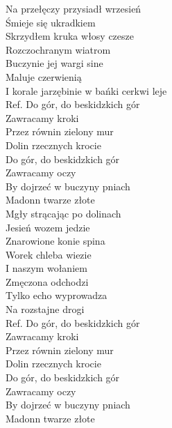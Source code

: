 
\begin{flushleft}
Na przełęczy przysiadł wrzesień  \\
Śmieje się ukradkiem\tab{} \\
Skrzydłem kruka włosy czesze\tab{}  \\
Rozczochranym wiatrom \tab{} \\
Buczynie jej wargi sine\tab{} \\
Maluje czerwienią \tab{} \\
I korale jarzębinie w bańki cerkwi leje \\
\vskip 3mm
Ref. Do gór, do beskidzkich gór \\
\hspace{0.9cm}Zawracamy kroki \tab{}\\
\hspace{0.9cm}Przez równin zielony mur \tab{} \\
\hspace{0.9cm}Dolin rzecznych krocie\tab{}  \\
\hspace{0.9cm}Do gór, do beskidzkich gór \\
\hspace{0.9cm}Zawracamy oczy \tab{}\\
\hspace{0.9cm}By dojrzeć w buczyny pniach  \\
\hspace{0.9cm}Madonn twarze złote\tab{}  \\
\vskip 3mm
Mgły strącając po dolinach \\
Jesień wozem jedzie \\
Znarowione konie spina \\
Worek chleba wiezie \\
I naszym wołaniem \\
Zmęczona odchodzi \\
Tylko echo wyprowadza \\
Na rozstajne drogi  \\
\vskip 3mm
Ref. Do gór, do beskidzkich gór\\
\hspace{0.9cm}Zawracamy kroki \\
\hspace{0.9cm}Przez równin zielony mur \\
\hspace{0.9cm}Dolin rzecznych krocie \\
\hspace{0.9cm}Do gór, do beskidzkich gór \\
\hspace{0.9cm}Zawracamy oczy \\
\hspace{0.9cm}By dojrzeć w buczyny pniach \\
\hspace{0.9cm}Madonn twarze złote \\
\end{flushleft}
\clearpage
